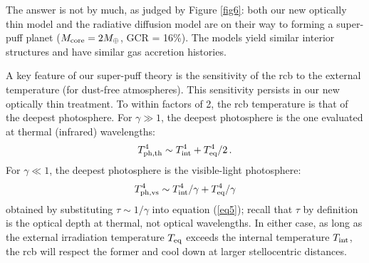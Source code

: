 \documentclass[fleqn,useAMS,usenatbib]{mnras}
\begin{document}
The answer is not by much,
as judged by Figure \ref{fig6}:
both our new optically thin model and the radiative diffusion
model are on their way to forming a super-puff planet
($M_{\rm core} = 2 M_\oplus$, GCR = 16\%). The models yield
similar interior structures and have similar gas accretion histories.

A key feature of our super-puff theory is the sensitivity of
the rcb to the external 
temperature (for dust-free atmospheres).
This sensitivity persists in our new optically thin treatment.
To within factors of 2, the rcb temperature is that of the deepest
photosphere. For $\gamma \gg 1$, the deepest photosphere
is the one evaluated at thermal (infrared) wavelengths: 
\begin{equation}
T_{\rm ph,th}^4 \sim T_{\rm int}^4 + T_{\rm eq}^4/2 \,.
\end{equation}
For $\gamma \ll 1$, the deepest photosphere is the
visible-light photosphere: 
\begin{equation}
T_{\rm ph,vs}^4 \sim T_{\rm int}^4/\gamma + T_{\rm eq}^4/\gamma
\end{equation}
obtained by substituting $\tau \sim 1/\gamma$ into equation (\ref{eq5});
recall that $\tau$ by definition is the optical depth at
thermal, not optical wavelengths.
In either case, as long as the external irradiation temperature
$T_{\rm eq}$ exceeds the internal temperature $T_{\rm int}$,
the rcb will respect
the former and cool down at larger stellocentric distances.
\end{document}
